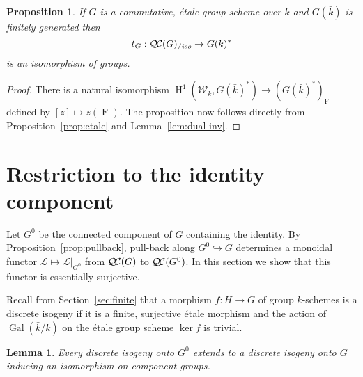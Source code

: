 \documentclass[11pt]{amsart}
\theoremstyle{plain}
\newtheorem{proposition}[theorem]{Proposition}
\newtheorem{lemma}[theorem]{Lemma}
\theoremstyle{definition}
\theoremstyle{remark}
\newcommand{\bFq}{\bar{k}}
\newcommand{\Fq}{k}
\DeclareMathOperator{\Gal}{Gal}
\newcommand{\Frob}[1]{\operatorname{F}_{#1}}
\DeclareMathOperator{\Hh}{H}
\newcommand{\qcs}[1]{{\mathcal{#1}}}
\newcommand{\QC}{{\mathcal{Q\hskip-0.8pt C}}}
\newcommand{\QCiso}[1]{\QC(#1)_{/\textit{iso}}}
\newcommand{\Weil}[1]{\mathcal{W}_{#1}}
\newcommand{\trFrob}[1]{t_{#1}}
\begin{document}
\begin{proposition} \label{prop:etale-iso}
 If $G$ is a commutative, \'etale group scheme over $\Fq$ and $G(\bFq)$ is finitely
 generated then
 \[
  \trFrob{G} : \QCiso{G} \to G(\Fq)^*
 \]
 is an isomorphism of groups.
\end{proposition}
\begin{proof}
There is a natural isomorphism $\Hh^1(\Weil{\Fq}, G(\bFq)^*) \to (G(\bFq)^*)_{\Frob{}}$ defined by $[z] \mapsto z(\Frob{})$.  The proposition now follows directly from Proposition~\ref{prop:etale} and Lemma~\ref{lem:dual-inv}.
\end{proof}

\section{Restriction to the identity component} \label{sec:restriction}

%

Let $G^0$ be the connected component of $G$ containing the identity.
By Proposition~\ref{prop:pullback}, pull-back along
$G^0\hookrightarrow G$ determines a monoidal functor
$\qcs{L}\mapsto \qcs{L}\vert_{G^0}$ from $\QC(G)$ to $\QC(G^0)$.  In
this section we show that this functor is essentially surjective. 

Recall from Section~\ref{sec:finite} that 
a morphism $f : H\to G$ of group $\Fq$-schemes is a discrete isogeny 
if it is a finite, surjective \'etale morphism and 
the action of $\Gal(\bFq/\Fq)$ on the \'etale group scheme $\ker f$ is trivial.

\begin{lemma}\label{lemma:ext}
Every discrete isogeny onto $G^0$ extends to a discrete
isogeny onto $G$ inducing an isomorphism on component groups.
\end{lemma}
\end{document}
